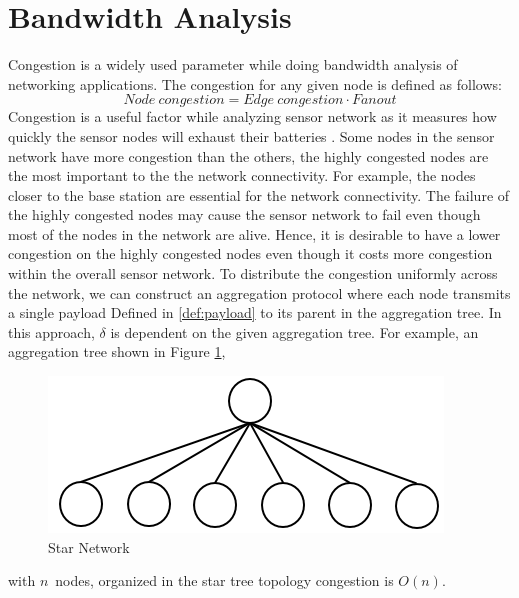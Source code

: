 \section{Bandwidth Analysis}
	Congestion is a widely used parameter while doing bandwidth analysis of networking applications.
	The congestion for any given node is defined as follows:
	\begin{equation}\label{def:congestion}
		Node\ congestion = Edge\ congestion \cdot Fanout
	\end{equation}
	Congestion is a useful factor while analyzing sensor network as it measures how quickly the sensor nodes will exhaust their batteries \cite{madden2003design}. 
	Some nodes in the sensor network have more congestion than the others, the highly congested nodes are the most important to the the network connectivity.
	For example, the nodes closer to the base station are essential for the network connectivity.
	The failure of the highly congested nodes may cause the sensor network to fail even though most of the nodes in the network are alive.
	Hence, it is desirable to have a lower congestion on the highly congested nodes even though it costs more congestion within the overall sensor network.
	To distribute the congestion uniformly across the network, we can construct an aggregation protocol where each node transmits a single payload Defined in \ref{def:payload} to its parent in the aggregation tree.
	In this approach, $\delta$ is dependent on the given aggregation tree.
	For example, an aggregation tree shown in Figure \ref{fig:star-network}, 
	\begin{figure}[h!]
		\centering
		\includegraphics[scale = 1]{images/star-tree.png}
		\caption{Star Network}
		\label{fig:star-network}
	\end{figure}
	with $n$\ nodes, organized in the star tree topology congestion is $O(n)$.
